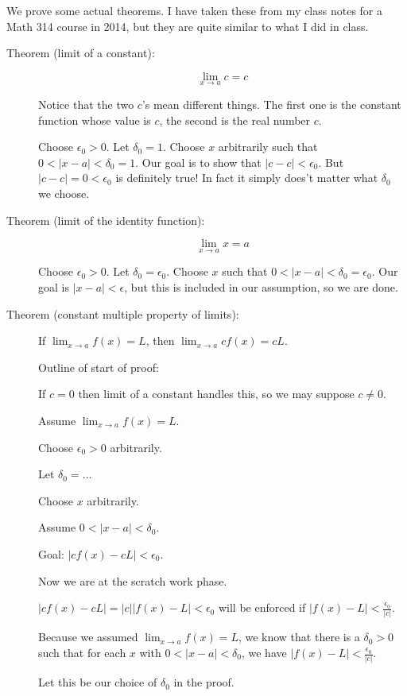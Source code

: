 \documentclass[12pt]{article}
\begin{document}
We prove some actual theorems.  I have taken these from my class notes for a Math 314 course in 2014, but they are quite similar to what I did in class.

\begin{description}

\item[Theorem (limit of a constant):]  $$\lim_{x \rightarrow a} c=c$$

Notice that the two $c$'s mean different things.  The first one is the constant function whose value is $c$,
the second is the real number $c$.

Choose $\epsilon_0>0$.  Let $\delta_0=1$.  Choose $x$ arbitrarily such that $0<|x-a|<\delta_0=1$.
Our goal is to show that $|c-c|<\epsilon_0$.  But $|c-c|=0<\epsilon_0$ is definitely true!  In fact it simply
does't matter what $\delta_0$ we choose.

\item[Theorem (limit of the identity function):]  $$\lim_{x \rightarrow a} x=a$$

Choose $\epsilon_0>0$.  Let $\delta_0=\epsilon_0$.  Choose $x$ such that $0<|x-a|<\delta_0=\epsilon_0$.
Our goal is $|x-a|<\epsilon$, but this is included in our assumption, so we are done.

\item[Theorem (constant multiple property of limits):]  If $\lim_{x\rightarrow a} f(x)= L$, then $\lim_{x \rightarrow a} cf(x) = cL$.

Outline of start of proof:

If $c=0$ then limit of a constant handles this, so we may suppose $c \neq 0$.

Assume $\lim_{x\rightarrow a} f(x)= L$.

Choose $\epsilon_0>0$ arbitrarily.

Let $\delta_0 =\ldots$

Choose $x$ arbitrarily.

Assume $0<|x-a|<\delta_0$.

Goal:  $|cf(x)-cL|<\epsilon_0$.

Now we are at the scratch work phase.

$|cf(x)-cL|=|c||f(x)-L|<\epsilon_0$ will be enforced if $|f(x)-L|<\frac{\epsilon_0}{|c|}$.

Because we assumed $\lim_{x\rightarrow a} f(x)= L$, we know that there is a $\delta_0>0$ such that
for each $x$ with $0<|x-a|<\delta_0$, we have $|f(x)-L|<\frac{\epsilon_0}{|c|}$.

Let this be our choice of $\delta_0$ in the proof.


\end{description}
\end{document}
